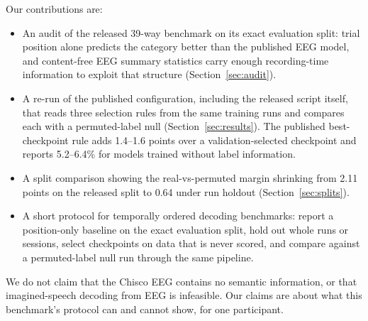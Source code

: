 Our contributions are:
\begin{itemize}
\item An audit of the released 39-way benchmark on its exact evaluation split: trial position alone
predicts the category better than the published EEG model, and content-free EEG summary statistics
carry enough recording-time information to exploit that structure (Section~\ref{sec:audit}).
\item A re-run of the published configuration, including the released script itself, that reads
three selection rules from the same training runs and compares each with a permuted-label null
(Section~\ref{sec:results}). The published best-checkpoint rule adds 1.4--1.6 points over a
validation-selected checkpoint and reports 5.2--6.4\% for models trained without label information.
\item A split comparison showing the real-vs-permuted margin shrinking from 2.11 points on the
released split to 0.64 under run holdout (Section~\ref{sec:splits}).
\item A short protocol for temporally ordered decoding benchmarks: report a position-only baseline
on the exact evaluation split, hold out whole runs or sessions, select checkpoints on data that is
never scored, and compare against a permuted-label null run through the same pipeline.
\end{itemize}

We do not claim that the Chisco EEG contains no semantic information, or that imagined-speech
decoding from EEG is infeasible. Our claims are about what this benchmark's protocol can and
cannot show, for one participant.
